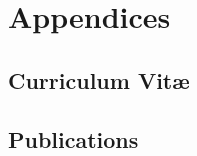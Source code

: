 

\chapter{Appendices}
\appendix

\ifpdf
    \graphicspath{{backmatter/figures/PNG/}{backmatter/figures/PDF/}{backmatter/figures/}}
\else
    \graphicspath{{backmatter/figures/EPS/}{backmatter/figures/}}
\fi


\section*{Curriculum Vit{\ae}}


\section*{Publications}

